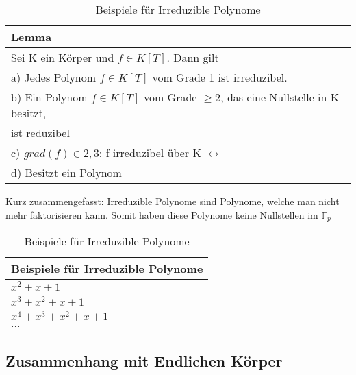 \begin{table}[!ht]
    \centering
        \begin{tabular}{l}
            \toprule
            \textbf{Lemma \cite{IrKr}}\\
            \midrule
            Sei K ein Körper und $ f \in K[T]$. Dann gilt\\
            a) Jedes Polynom $ f \in K[T]$ vom Grade 1 ist irreduzibel.\\
            b) Ein Polynom $ f \in K[T]$ vom Grade $\geq 2$, das eine Nullstelle in K besitzt,\\
             ist reduzibel \\
            c) $grad(f) \in {2,3}$: f irreduzibel über K $ \leftrightarrow $ \\
            d) Besitzt ein Polynom $ $\\
           \bottomrule
        \end{tabular}
        \caption{Beispiele für Irreduzible Polynome}
        \label{tab3}
    \end{table}


Kurz zusammengefasst: Irreduzible Polynome sind Polynome, welche man nicht mehr faktorisieren kann. Somit haben diese Polynome keine Nullstellen im $\mathbb{F}_{p} $


\begin{table}[!ht]
    \centering
        \begin{tabular}{l}
            \toprule
            \textbf{Beispiele für Irreduzible Polynome}\\
            \midrule
            $ x^2+ x + 1$\\
            $x^3 + x^2 + x + 1$ \\
            $x^4 + x^3  + x^2 + x + 1$\\
            $...$\\
           \bottomrule
        \end{tabular}
        \caption{Beispiele für Irreduzible Polynome}
        \label{tab3}
    \end{table}

\subsection{Zusammenhang mit Endlichen Körper}

